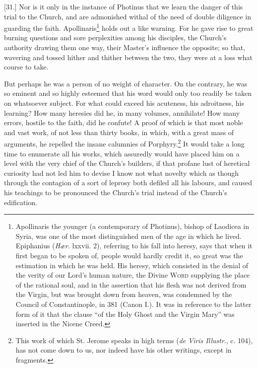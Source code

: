 [31.] Nor is it only in the instance of Photinus that we learn the danger of this trial to the Church, and are admonished withal of the need of double diligence in guarding the faith. Apollinaris\footnote{Apollinaris the younger (a contemporary of Photinus), bishop of Laodicea in Syria, was one of the most distinguished men of the age in which he lived. Epiphanius (\emph{Hær}. lxxvii. 2), referring to his fall into heresy, says that when it first began to be spoken of, people would hardly credit it, so great was the estimation in which he was held. His heresy, which consisted in the denial of the verity of our Lord’s human nature, the Divine \textsc{Word} supplying the place of the rational soul, and in the assertion that his flesh was not derived from the Virgin, but was brought down from heaven, was condemned by the Council of Constantinople, in 381 (Canon I.). It was in reference to the latter form of it that the clause “of the Holy Ghost and the Virgin Mary” was inserted in the Nicene Creed.} holds out a like warning. For he gave rise to great burning questions and sore perplexities among his disciples, the Church’s authority drawing them one way, their Master’s influence the opposite; so that, wavering and tossed hither and thither between the two, they were at a loss what course to take.

But perhaps he was a person of no weight of character. On the contrary, he was so eminent and so highly esteemed that his word would only too readily be taken on whatsoever subject. For what could exceed his acuteness, his adroitness, his learning? How many heresies did he, in many volumes, annihilate! How many errors, hostile to the faith, did he confute! A proof of which is that most noble and vast work, of not less than thirty books, in which, with a great mass of arguments, he repelled the insane calumnies of Porphyry.\footnote{This work of which St. Jerome speaks in high terms (\emph{de Viris Illustr}., c. 104), has not come down to us, nor indeed have his other writings, except in fragments.} It would take a long time to enumerate all his works, which assuredly would have placed him on a level with the very chief of the Church’s builders, if that profane lust of heretical curiosity had not led him to devise I know not what novelty which as though through the contagion of a sort of leprosy both defiled all his labours, and caused his teachings to be pronounced the Church’s trial instead of the Church’s edification.


